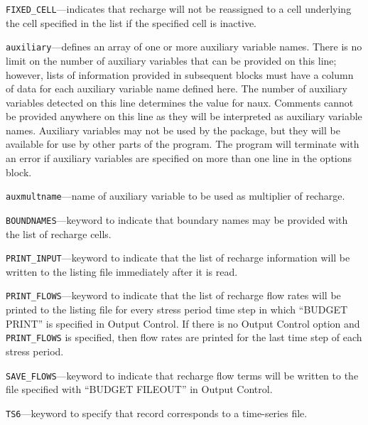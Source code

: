
\item \texttt{FIXED\_CELL}---indicates that recharge will not be reassigned to a cell underlying the cell specified in the list if the specified cell is inactive.

\item \texttt{auxiliary}---defines an array of one or more auxiliary variable names.  There is no limit on the number of auxiliary variables that can be provided on this line; however, lists of information provided in subsequent blocks must have a column of data for each auxiliary variable name defined here.   The number of auxiliary variables detected on this line determines the value for naux.  Comments cannot be provided anywhere on this line as they will be interpreted as auxiliary variable names.  Auxiliary variables may not be used by the package, but they will be available for use by other parts of the program.  The program will terminate with an error if auxiliary variables are specified on more than one line in the options block.

\item \texttt{auxmultname}---name of auxiliary variable to be used as multiplier of recharge.

\item \texttt{BOUNDNAMES}---keyword to indicate that boundary names may be provided with the list of recharge cells.

\item \texttt{PRINT\_INPUT}---keyword to indicate that the list of recharge information will be written to the listing file immediately after it is read.

\item \texttt{PRINT\_FLOWS}---keyword to indicate that the list of recharge flow rates will be printed to the listing file for every stress period time step in which ``BUDGET PRINT'' is specified in Output Control.  If there is no Output Control option and \texttt{PRINT\_FLOWS} is specified, then flow rates are printed for the last time step of each stress period.

\item \texttt{SAVE\_FLOWS}---keyword to indicate that recharge flow terms will be written to the file specified with ``BUDGET FILEOUT'' in Output Control.

\item \texttt{TS6}---keyword to specify that record corresponds to a time-series file.

